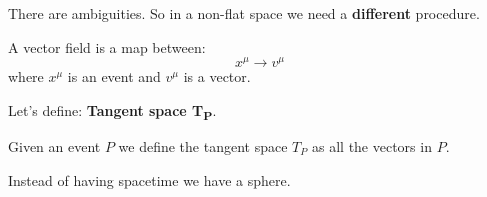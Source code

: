 \documentclass{report}
\begin{document}
There are ambiguities. So in a non-flat space we need a \textbf{different} procedure. \par
A vector field is a map between:
\[
x^{\mu } \to v^{\mu }
\]
where $x^{\mu }$ is an event and $v^{\mu }$ is a vector. \par

Let's define: \textbf{Tangent space T\textsubscript{P}}.\par
Given an event $P$ we define the tangent space $T_{P}$ as all the vectors in $P$.\par

Instead of having spacetime we have a sphere.

\noindent
\begin{minipage}[t]{0.48\textwidth}
    \vspace*{0pt}
    


\begin{tikzpicture}[x=0.5pt,y=0.5pt,yscale=-1,xscale=1]


\end{tikzpicture}
\end{minipage}
\end{document}
